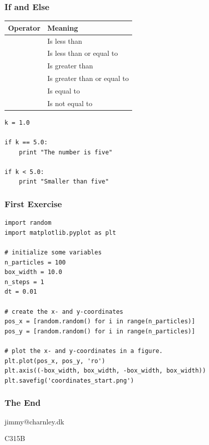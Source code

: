 \documentclass{beamer}
\begin{document}
\begin{frame}[fragile]

    \frametitle{If and Else}

    \centering

    \begin{tabular}{l l}

        \bf Operator & \bf Meaning \\

        \midrule

        \code{<}  & Is less than \\
        \code{<=} & Is less than or equal to \\
        \code{>}  & Is greater than \\
        \code{>=} & Is greater than or equal to \\
        \code{==} & Is equal to \\
        \code{!=} & Is not equal to\\

    \end{tabular}

    \bigskip

\begin{lstlisting}
k = 1.0

if k == 5.0:
    print "The number is five"

if k < 5.0:
    print "Smaller than five"

\end{lstlisting}


\end{frame}






\begin{frame}[fragile]

    \frametitle{First Exercise}

\begin{lstlisting}
import random
import matplotlib.pyplot as plt

# initialize some variables
n_particles = 100
box_width = 10.0
n_steps = 1
dt = 0.01

# create the x- and y-coordinates
pos_x = [random.random() for i in range(n_particles)]
pos_y = [random.random() for i in range(n_particles)]

# plot the x- and y-coordinates in a figure.
plt.plot(pos_x, pos_y, 'ro')
plt.axis((-box_width, box_width, -box_width, box_width))
plt.savefig('coordinates_start.png')

\end{lstlisting}


\end{frame}





\frame
{
    \frametitle{The End}

    \bigskip
    jimmy@charnley.dk

    \bigskip

    C315B

}




\end{document}
